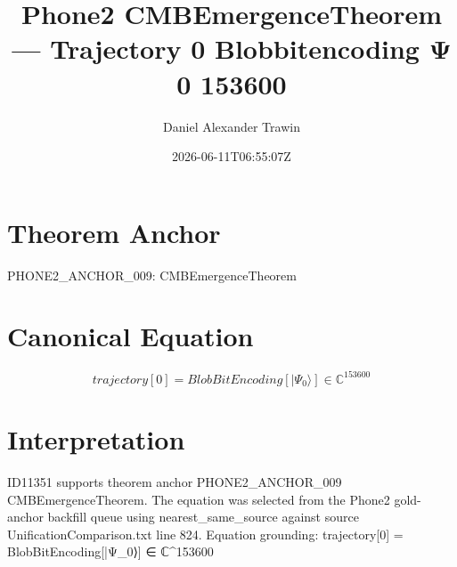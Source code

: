 \documentclass[11pt]{article}
\title{Phone2 CMBEmergenceTheorem — Trajectory 0 Blobbitencoding Ψ 0 153600}
\author{Daniel Alexander Trawin}
\date{2026-06-11T06:55:07Z}
\begin{document}
\maketitle
\section*{Theorem Anchor}
PHONE2_ANCHOR_009: CMBEmergenceTheorem
\section*{Canonical Equation}
\[
trajectory[0] = BlobBitEncoding[|Ψ_0⟩] ∈ ℂ^{153600}
\]
\section*{Interpretation}
ID11351 supports theorem anchor PHONE2_ANCHOR_009 CMBEmergenceTheorem. The equation was selected from the Phone2 gold-anchor backfill queue using nearest_same_source against source UnificationComparison.txt line 824. Equation grounding: trajectory[0] = BlobBitEncoding[|Ψ_0⟩] ∈ ℂ^{153600}
\end{document}
